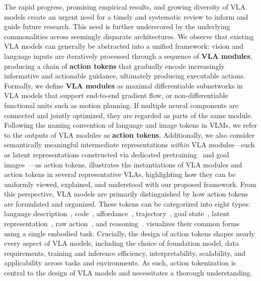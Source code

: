 \documentclass[10pt, a4paper, logo, copyright]{googledeepmind} %
\begin{document}
The rapid progress, promising empirical results, and growing diversity of VLA models create an urgent need for a timely and systematic review to inform and guide future research. This need is further underscored by the underlying commonalities across seemingly disparate architectures. We observe that existing VLA models can generally be abstracted into a unified framework: vision and language inputs are iteratively processed through a sequence of \textbf{VLA modules}, producing a chain of \textbf{action tokens} that gradually encode increasingly informative and actionable guidance, ultimately producing executable actions. Formally, we define \textbf{VLA modules} as maximal differentiable subnetworks in VLA models that support end-to-end gradient flow, or non-differentiable functional units such as motion planning. If multiple neural components are connected and jointly optimized, they are regarded as parts of the same module. Following the naming convention of language and image tokens in VLMs, we refer to the outputs of VLA modules as \textbf{action tokens}. Additionally, we also consider semantically meaningful intermediate representations \emph{within} VLA modules---such as latent representations constructed via dedicated pretraining~\cite{bu2025agibot} and goal images~\cite{zhao2025cot}---as action tokens.  illustrates the instantiations of VLA modules and action tokens in several representative VLAs, highlighting how they can be uniformly viewed, explained, and understood with our proposed framework. From this perspective, VLA models are primarily distinguished by how action tokens are formulated and organized. These tokens can be categorized into eight types: language description~\cite{shi2025hi, rth2024arxiv}, code~\cite{liang2023code, Singh2022ProgPromptGS}, affordance~\cite{huang2023voxposer, huang2024rekepspatiotemporalreasoningrelational}, trajectory~\cite{rt-trajectory, wen2023any}, goal state~\cite{zhen20243d, zhao2025cot}, latent representation~\cite{ye2024latent, bu2025agibot}, raw action~\cite{kim2024openvla, black2410pi0}, and reasoning~\cite{ECoT, clark2025action}.
 visualizes their common forms using a single embodied task. Crucially, the design of action tokens shapes nearly every aspect of VLA models, including the choice of foundation model, data requirements, training and inference efficiency, interpretability, scalability, and applicability across tasks and environments. As such, action tokenization is central to the design of VLA models and necessitates a thorough understanding.
\end{document}

